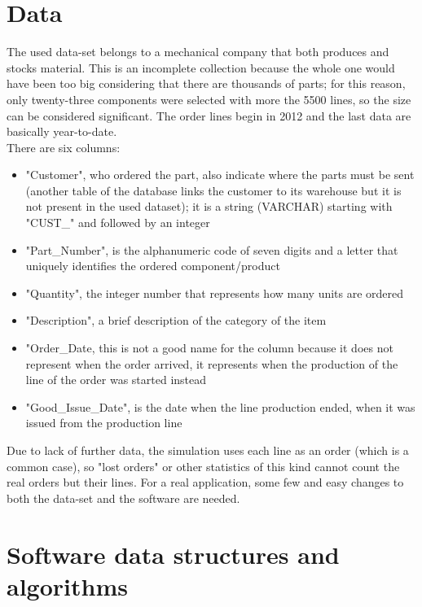 \documentclass[a4paper,12pt]{article}
\begin{document}
\section{Data}
The used data-set belongs to a mechanical company that both produces and stocks material. This is an incomplete collection because the whole one would have been too big considering that there are thousands of parts; for this reason, only twenty-three components were selected with more the 5500 lines, so the size can be considered significant. The order lines begin in 2012  and the last data are basically year-to-date. \\
There are six columns:
\begin{itemize}
	 \item "Customer", who ordered the part, also indicate where the parts must be sent (another table of the database links the customer to its warehouse but it is not present in the used dataset); it is a string (VARCHAR) starting with "CUST\_" and followed by an integer
	 \item "Part\_Number", is the alphanumeric code of seven digits and a letter that uniquely identifies the ordered component/product
	\item "Quantity", the integer number that represents how many units are ordered
	\item "Description", a brief description of the category of the item
	\item "Order\_Date, this is not a good name for the column because it does not represent when the order arrived, it represents when the production of the line of the order was started instead
	\item "Good\_Issue\_Date", is the date when the line production ended, when it was issued from the production line
\end{itemize}
Due to lack of further data, the simulation uses each line as an order (which is a common case), so "lost orders" or other statistics of this kind cannot count the real orders but their lines. For a real application, some few and easy changes to both the data-set and the software are needed.

\newpage
\section{Software data structures and algorithms}
\end{document}
